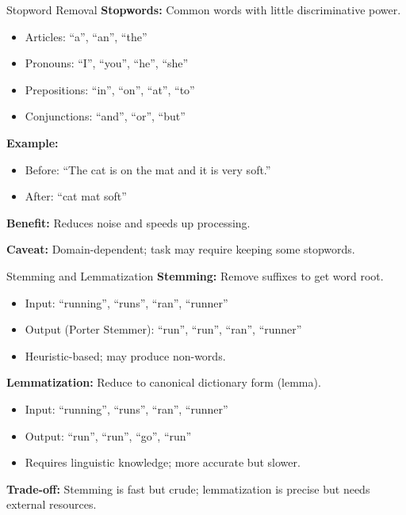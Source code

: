 \documentclass[10pt]{beamer}
\begin{document}
\begin{frame}{Stopword Removal}
    \textbf{Stopwords:} Common words with little discriminative power.
    \begin{itemize}
        \item Articles: ``a'', ``an'', ``the''
        \item Pronouns: ``I'', ``you'', ``he'', ``she''
        \item Prepositions: ``in'', ``on'', ``at'', ``to''
        \item Conjunctions: ``and'', ``or'', ``but''
    \end{itemize}

    \vspace{0.2cm}
    \textbf{Example:}
    \begin{itemize}
        \item Before: ``The cat is on the mat and it is very soft.''
        \item After: ``cat mat soft''
    \end{itemize}

    \vspace{0.2cm}
    \textbf{Benefit:} Reduces noise and speeds up processing.

    \vspace{0.1cm}
    \textbf{Caveat:} Domain-dependent; task may require keeping some stopwords.
\end{frame}

\begin{frame}{Stemming and Lemmatization}
    \textbf{Stemming:} Remove suffixes to get word root.
    \begin{itemize}
        \item Input: ``running'', ``runs'', ``ran'', ``runner''
        \item Output (Porter Stemmer): ``run'', ``run'', ``ran'', ``runner''
        \item Heuristic-based; may produce non-words.
    \end{itemize}

    \vspace{0.2cm}
    \textbf{Lemmatization:} Reduce to canonical dictionary form (lemma).
    \begin{itemize}
        \item Input: ``running'', ``runs'', ``ran'', ``runner''
        \item Output: ``run'', ``run'', ``go'', ``run''
        \item Requires linguistic knowledge; more accurate but slower.
    \end{itemize}

    \vspace{0.2cm}
    \textbf{Trade-off:} Stemming is fast but crude; lemmatization is precise but needs external resources.
\end{frame}
\end{document}
